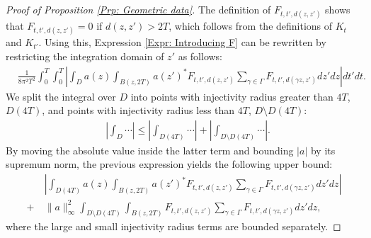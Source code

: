 \documentclass[10pt,a4paper]{amsart}
\begin{document}
\begin{proof}[Proof of Proposition \ref{Prp: Geometric data}]
The definition of $ F_{t,t', d( z,z' )} $ shows that $ F_{t,t',d( z,z' )} = 0 $ if $ d( z,z' ) > 2T $, which follows from the definitions of $ K_{t} $ and $ K_{t'} $. Using this, Expression \eqref{Expr: Introducing F} can be rewritten by restricting the integration domain of \(z'\) as follows:
\begin{align}
	&
	\label{Expr: Before large small InjRad split}
	\frac{1}{8 \pi^{2} T^{2}} \int_{0}^{T} \int_{0}^{T} \left| \int_{D} a( z ) \int_{ B( z, 2T ) } a( z' )^{*}   F_{t,t', d( z,z' )}  \sum_{\gamma \in \Gamma}^{} F_{t,t', d( \gamma z, z' )} dz' dz \right| dt' dt.
\end{align}
We split the integral over $ D $ into points with injectivity radius greater than $ 4T $, $ D( 4T ) $, and points with injectivity radius less than $ 4T $, $ D \setminus D( 4T ) $:
\begin{align*}
	&
	\left| \int_{D} \cdots \right| \leq
	\left| \int_{D( 4T )} \cdots \right| 
	+  \left| \int_{D \setminus D( 4T )} \cdots \right|.
\end{align*}
By moving the absolute value inside the latter term and bounding \( |a| \) by its supremum norm, the previous expression yields the following upper bound:
\begin{align}
	&
	\nonumber
	\left| \int_{D( 4T )} a( z ) \int_{ B( z, 2T ) } a( z' )^{*}   F_{t,t', d( z,z' )}  \sum_{\gamma \in \Gamma}^{} F_{t,t', d( \gamma z, z' )} dz' dz \right| 
	\\
	+ \ & 
	\| a \|_{\infty}^{2} \int_{D \setminus D( 4T )} \int_{ B( z, 2T ) }  F_{t,t', d( z,z' )}  \sum_{\gamma \in \Gamma}^{} F_{t,t', d( \gamma z, z' )} dz' dz,
\end{align}
where the large and small injectivity radius terms are bounded separately. 


\end{proof}
\end{document}
